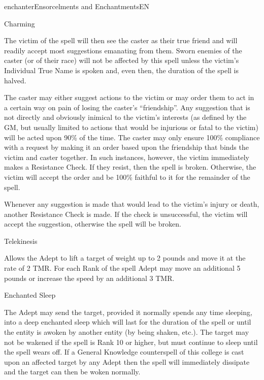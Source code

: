 \begin{college}[1.1]{enchanter}{Ensorcelments and Enchantments}{EN}
\begin{spell}[G-1]{Charming}
\begin{effects}
The victim of the spell will then see the caster as their true friend
and will readily accept most suggestions emanating from them. Sworn
enemies of the caster (or of their race) will not be affected by this
spell unless the victim's Individual True Name is spoken and, even
then, the duration of the spell is halved.

The caster may either suggest actions to the victim or may order them
to act in a certain way on pain of losing the caster's ``friendship''.
Any suggestion that is not directly and obviously inimical to the
victim's interests (as defined by the GM, but usually limited to
actions that would be injurious or fatal to the victim) will be acted
upon 90\% of the time. The caster may only ensure 100\% compliance
with a request by making it an order based upon the friendship that
binds the victim and caster together. In such instances, however, the
victim immediately makes a Resistance Check. If they resist, then the
spell is broken. Otherwise, the victim will accept the order and be
100\% faithful to it for the remainder of the spell.

Whenever any suggestion is made that would lead to the victim's injury
or death, another Resistance Check is made. If the check is
unsuccessful, the victim will accept the suggestion, otherwise the
spell will be broken.

\end{effects}
\end{spell}

\begin{spell}[G-2]{Telekinesis}

\begin{effects}
Allows the Adept to lift a target of weight up to 2 pounds and move it
at the rate of 2 TMR. For each Rank of the spell Adept may move an
additional 5 pounds or increase the speed by an additional 3 TMR.
\end{effects}
\end{spell}

\begin{spell}[G-3]{Enchanted Sleep}

\begin{effects}
The Adept may send the target, provided it normally spends any time
sleeping, into a deep enchanted sleep which will last for the duration
of the spell or until the entity is awoken by another entity (by being
shaken, etc.). The target may not be wakened if the spell is Rank 10
or higher, but must continue to sleep until the spell wears off.  If a
General Knowledge counterspell of this college is cast upon an
affected target by any Adept then the spell will immediately dissipate
and the target can then be woken normally.
\end{effects}
\end{spell}


\end{college}
